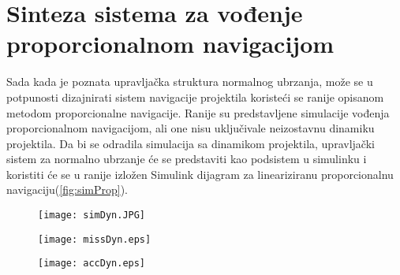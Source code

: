 \section{Sinteza sistema za vođenje proporcionalnom navigacijom}
Sada kada je poznata upravljačka struktura normalnog ubrzanja, može se u potpunosti dizajnirati 
sistem navigacije projektila koristeći se ranije opisanom metodom proporcionalne navigacije. Ranije 
su predstavljene simulacije vođenja proporcionalnom navigacijom, ali one nisu uključivale neizostavnu dinamiku projektila. 
Da bi se odradila simulacija sa dinamikom projektila, upravljački sistem za normalno ubrzanje će se predstaviti 
kao podsistem u simulinku i koristiti će se u ranije izložen Simulink dijagram za lineariziranu proporcionalnu navigaciju(\ref{fig:simProp}). 
\begin{figure}[!ht]
    \centering
    \texttt{[image: simDyn.JPG]}
\end{figure}

\begin{figure}[!ht]
    \centering
    \texttt{[image: missDyn.eps]}
\end{figure}
\begin{figure}[!ht]
    \centering
    \texttt{[image: accDyn.eps]}
\end{figure}

